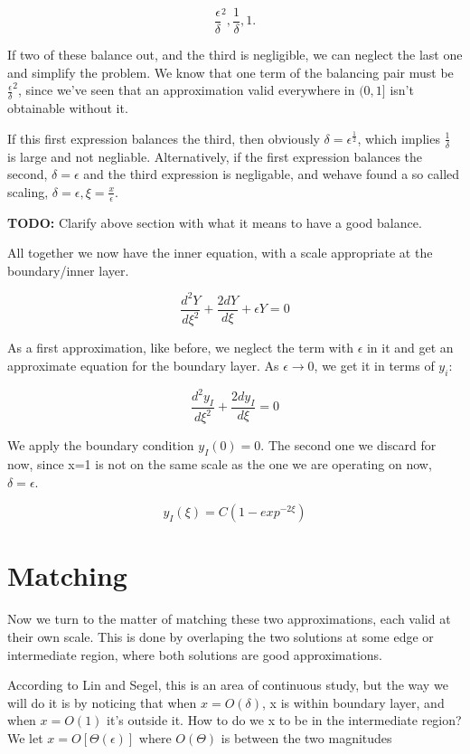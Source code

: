 \documentclass[12pt]{report}
\begin{document}
$$\frac \epsilon \delta^2, \frac 1 \delta, 1.$$

If two of these balance out, and the third is negligible, we can
neglect the last one and simplify the problem. We know that one term of
the balancing pair must be $\frac \epsilon \delta^2$, since we've seen
that an approximation valid everywhere in $(0,1]$ isn't obtainable
  without it.

If this first expression balances the third, then obviously $\delta =
\epsilon^{\frac 1 2}$, which implies $\frac 1 \delta$ is large and not
negliable. Alternatively, if the first expression balances the second,
$\delta = \epsilon$ and the third expression is negligable, and wehave
found a so called scaling, $\delta = \epsilon, \xi=\frac x \epsilon$.

\textbf{TODO:} Clarify above section with what it means to have a good balance.

All together we now have the inner equation, with a scale appropriate
at the boundary/inner layer.

$$\frac{d^2Y}{d\xi^2} + \frac{2dY}{d\xi} + \epsilon Y = 0$$

As a first approximation, like before, we neglect the term with
$\epsilon$ in it and get an approximate equation for the boundary
layer. As $\epsilon \to 0$, we get it in terms of $y_i$:

$$\frac{d^2y_I}{d\xi^2} + \frac{2dy_I}{d\xi} = 0$$

We apply the boundary condition $y_I(0) = 0$. The second one we
discard for now, since x=1 is not on the same scale as the one we are
operating on now, $\delta=\epsilon$.

$$y_I(\xi) = C(1-exp^{-2\xi})$$

\section{Matching}

Now we turn to the matter of matching these two approximations, each
valid at their own scale. This is done by overlaping the two solutions
at some edge or intermediate region, where both solutions are good
approximations.

According to Lin and Segel, this is an area of continuous study, but
the way we will do it is by noticing that when $x=O(\delta)$, x is
within boundary layer, and when $x=O(1)$ it's outside it. How to do we
x to be in the intermediate region? We let $x=O[\Theta(\epsilon)]$
where $O(\Theta)$ is between the two magnitudes
\end{document}
